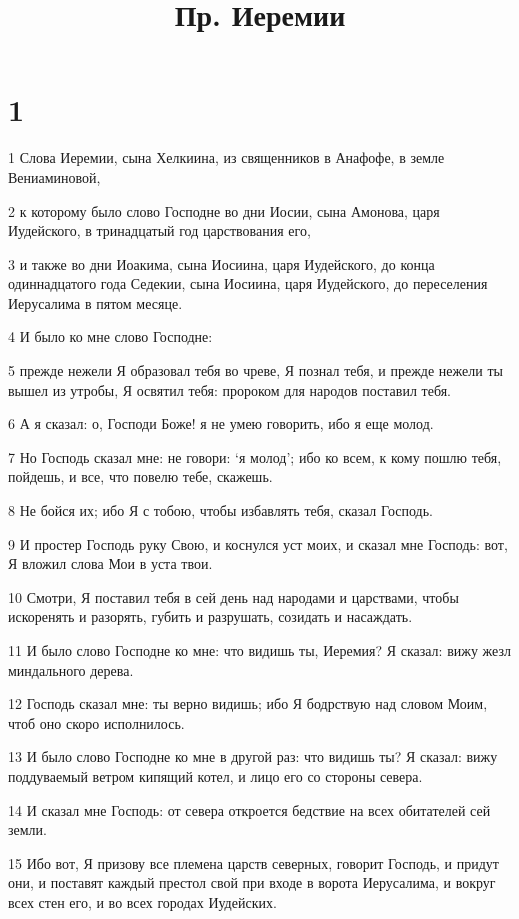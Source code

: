 

\title{Пр. Иеремии}


\chapter{1}

\par 1 Слова Иеремии, сына Хелкиина, из священников в Анафофе, в земле Вениаминовой,
\par 2 к которому было слово Господне во дни Иосии, сына Амонова, царя Иудейского, в тринадцатый год царствования его,
\par 3 и также во дни Иоакима, сына Иосиина, царя Иудейского, до конца одиннадцатого года Седекии, сына Иосиина, царя Иудейского, до переселения Иерусалима в пятом месяце.
\par 4 И было ко мне слово Господне:
\par 5 прежде нежели Я образовал тебя во чреве, Я познал тебя, и прежде нежели ты вышел из утробы, Я освятил тебя: пророком для народов поставил тебя.
\par 6 А я сказал: о, Господи Боже! я не умею говорить, ибо я еще молод.
\par 7 Но Господь сказал мне: не говори: `я молод'; ибо ко всем, к кому пошлю тебя, пойдешь, и все, что повелю тебе, скажешь.
\par 8 Не бойся их; ибо Я с тобою, чтобы избавлять тебя, сказал Господь.
\par 9 И простер Господь руку Свою, и коснулся уст моих, и сказал мне Господь: вот, Я вложил слова Мои в уста твои.
\par 10 Смотри, Я поставил тебя в сей день над народами и царствами, чтобы искоренять и разорять, губить и разрушать, созидать и насаждать.
\par 11 И было слово Господне ко мне: что видишь ты, Иеремия? Я сказал: вижу жезл миндального дерева.
\par 12 Господь сказал мне: ты верно видишь; ибо Я бодрствую над словом Моим, чтоб оно скоро исполнилось.
\par 13 И было слово Господне ко мне в другой раз: что видишь ты? Я сказал: вижу поддуваемый ветром кипящий котел, и лицо его со стороны севера.
\par 14 И сказал мне Господь: от севера откроется бедствие на всех обитателей сей земли.
\par 15 Ибо вот, Я призову все племена царств северных, говорит Господь, и придут они, и поставят каждый престол свой при входе в ворота Иерусалима, и вокруг всех стен его, и во всех городах Иудейских.
